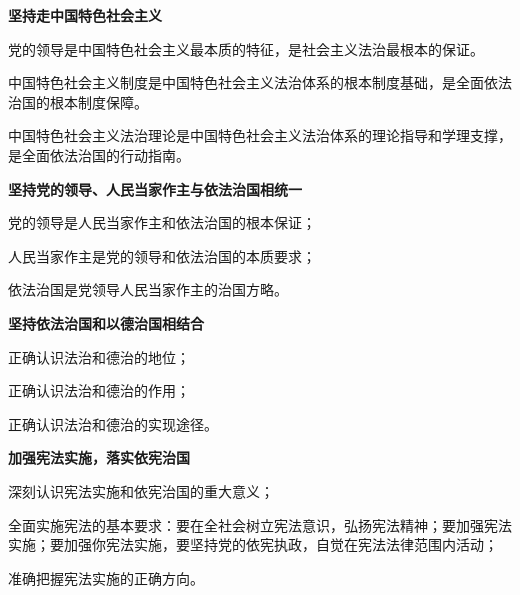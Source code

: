 \textbf{\textbf{}{坚持走中国特色社会主义}}

{党的领导是中国特色社会主义最本质的特征，是社会主义法治最根本的保证。}

{中国特色社会主义制度是中国特色社会主义法治体系的根本制度基础，是全面依法治国的根本制度保障。}

{中国特色社会主义法治理论是中国特色社会主义法治体系的理论指导和学理支撑，是全面依法治国的行动指南。}

\textbf{{坚持党的领导、人民当家作主与依法治国相统一}}

{党的领导是人民当家作主和依法治国}{的根本保证；}

{人民当家作主是党的领导和依法治国的本质要求；}

{依法治国是党领导人民当家作主的治国方略。}

\textbf{{坚持依法治国和以德治国相结合}}

{正确认识法治和德治的地位；}

{正确认识法治和德治的作用；}

{正确认识法治和德治的实现途径。}

\textbf{{加强宪法实施，落实依宪治国}}

{深刻认识宪法实施和依宪治国的重大意义；}

{全面实施宪法的基本要求：要在全社会树立宪法意识，弘扬宪法精神；要加强宪法实施；要加强你宪法实施，要坚持党的依宪执政，自觉在宪法法律范围内活动；}

{准确把握宪法实施的正确方向。}
